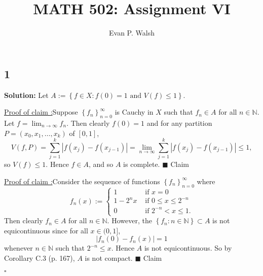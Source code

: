 \documentclass[12pt]{article}
\title{MATH 502: Assignment VI}
\author{Evan P. Walsh}
\newcounter{ProofCounter}
\newcounter{ClaimCounter}[ProofCounter]
\newenvironment{Solution}{\stepcounter{ProofCounter}\textbf{Solution:}}{\hfill$\square$}
\newenvironment{claim}[1]{\vspace{1mm}\stepcounter{ClaimCounter}\par\noindent\underline{\bf Claim \theClaimCounter:}\space#1}{}
\newenvironment{claimproof}[1]{\par\noindent\underline{Proof of claim \theClaimCounter:}\space#1}{\hfill $\blacksquare$ Claim \theClaimCounter}
\begin{document}
\maketitle


\subsection*{1}
\begin{Solution}
  Let $A := \left\{ f \in X : f(0) = 1 \text{ and } V(f) \leq 1 \right\}$.

  \begin{claimproof}
    Suppose $\left\{ f_n \right\}_{n=0}^{\infty}$ is Cauchy in $X$ such that $f_n \in A$ for all $n \in \mathbb{N}$. Let $f =
    \lim_{n\rightarrow\infty}f_n$. Then clearly $f(0) = 1$ and for any partition $P = (x_0, x_1, \dots, x_k)$ of $[0,1]$,
    \[
      V(f,P) = \sum_{j=1}^{k}|f(x_j) - f(x_{j-1})| = \lim_{n\rightarrow\infty}\sum_{j=1}^{k}|f(x_j) - f(x_{j-1})| \leq 1,
    \]
    so $V(f) \leq 1$. Hence $f \in A$, and so $A$ is complete.
  \end{claimproof}

  \begin{claimproof}
    Consider the sequence of functions $\left\{ f_n \right\}_{n=0}^{\infty}$ where 
    \[
      f_{n}(x) := \left\{ \begin{array}{cl}
          1 & \text{ if } x = 0 \\
          1 - 2^{n}x & \text{ if } 0 \leq x \leq 2^{-n} \\
          0 & \text{ if } 2^{-n} < x \leq 1.
      \end{array} \right.
    \]
    Then clearly $f_n \in A$ for all $n \in \mathbb{N}$. However, the $\left\{ f_n : n \in \mathbb{N} \right\} \subset A$ is not equicontinuous since for all $x \in (0,1]$,
    \[
      |f_n(0) - f_n(x)| = 1
    \]
    whenever $n \in \mathbb{N}$ such that $2^{-n} \leq x$. Hence $A$ is not equicontinuous. So by Corollary C.3 (p. 167), $A$ is not compact.
  \end{claimproof}

\end{Solution}


\newpage
\end{document}
